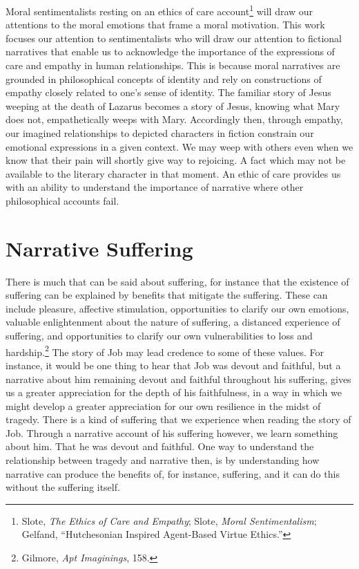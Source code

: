 \documentclass[phdthesis,12pt,final,a4paper]{wuthesis}
\theoremstyle{definition}
\theoremstyle{definition}
\theoremstyle{definition}
\theoremstyle{definition}
\theoremstyle{remark}
\begin{document}
Moral sentimentalists resting on an ethics of care account\footnote{Slote, \emph{The {Ethics} of {Care} and {Empathy}}; Slote, \emph{Moral {Sentimentalism}}; Gelfand, {``Hutchesonian Inspired Agent-Based Virtue Ethics.''}} will draw our attentions to the moral emotions that frame a moral motivation. This work focuses our attention to sentimentalists who will draw our attention to fictional narratives that enable us to acknowledge the importance of the expressions of care and empathy in human relationships. This is because moral narratives are grounded in philosophical concepts of identity and rely on constructions of empathy closely related to one's sense of identity. The familiar story of Jesus weeping at the death of Lazarus becomes a story of Jesus, knowing what Mary does not, empathetically weeps with Mary. Accordingly then, through empathy, our imagined relationships to depicted characters in fiction constrain our emotional expressions in a given context. We may weep with others even when we know that their pain will shortly give way to rejoicing. A fact which may not be available to the literary character in that moment. An ethic of care provides us with an ability to understand the importance of narrative where other philosophical accounts fail.

\section{Narrative Suffering}\label{narrative-suffering}

There is much that can be said about suffering, for instance that the existence of suffering can be explained by benefits that mitigate the suffering. These can include pleasure, affective stimulation, opportunities to clarify our own emotions, valuable enlightenment about the nature of suffering, a distanced experience of suffering, and opportunities to clarify our own vulnerabilities to loss and hardship.\footnote{Gilmore, \emph{Apt {Imaginings}}, 158.} The story of Job may lead credence to some of these values. For instance, it would be one thing to hear that Job was devout and faithful, but a narrative about him remaining devout and faithful throughout his suffering, gives us a greater appreciation for the depth of his faithfulness, in a way in which we might develop a greater appreciation for our own resilience in the midst of tragedy. There is a kind of suffering that we experience when reading the story of Job. Through a narrative account of his suffering however, we learn something about him. That he was devout and faithful. One way to understand the relationship between tragedy and narrative then, is by understanding how narrative can produce the benefits of, for instance, suffering, and it can do this without the suffering itself.
\end{document}
